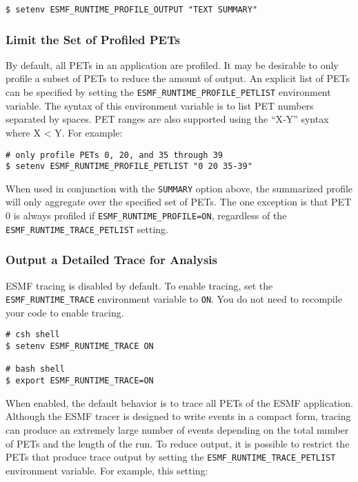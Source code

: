 \begin{verbatim}
$ setenv ESMF_RUNTIME_PROFILE_OUTPUT "TEXT SUMMARY"
\end{verbatim}


\subsubsection{Limit the Set of Profiled PETs}
\label{sec:LimitProfiling}

By default, all PETs in an application are profiled. It may be desirable
to only profile a subset of PETs to reduce the amount of output.
An explicit list of PETs can be specified by setting the
{\tt ESMF\_RUNTIME\_PROFILE\_PETLIST} environment variable.
The syntax of this environment variable is to list
PET numbers separated by spaces. PET ranges are also supported using
the ``X-Y'' syntax where X < Y.
For example:

\begin{verbatim}
# only profile PETs 0, 20, and 35 through 39
$ setenv ESMF_RUNTIME_PROFILE_PETLIST "0 20 35-39"
\end{verbatim}

When used in conjunction with the {\tt SUMMARY} option above, the summarized
profile will only aggregate over the specified set of PETs. The one exception is that
PET 0 is always profiled if {\tt ESMF\_RUNTIME\_PROFILE=ON}, regardless of the
{\tt ESMF\_RUNTIME\_TRACE\_PETLIST} setting.


\subsubsection{Output a Detailed Trace for Analysis}


ESMF tracing is disabled by default. To enable tracing, set the
{\tt ESMF\_RUNTIME\_TRACE} environment variable to {\tt ON}. You
do not need to recompile your code to enable tracing.

\begin{verbatim}
# csh shell
$ setenv ESMF_RUNTIME_TRACE ON

# bash shell
$ export ESMF_RUNTIME_TRACE=ON
\end{verbatim}

When enabled, the default behavior is to trace all PETs of the
ESMF application. Although the ESMF tracer is designed to write 
events in a compact form, tracing can produce an extremely
large number of events depending on the total number of PETs and
the length of the run. To reduce output, it is possible to restrict
the PETs that produce trace output by setting the {\tt ESMF\_RUNTIME\_TRACE\_PETLIST}
environment variable. For example, this setting:

